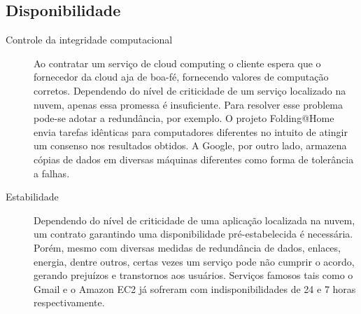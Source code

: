 \documentclass[brazil,12pt]{article}
\begin{document}
\subsection{Disponibilidade}
\begin{description}
  \item[Controle da integridade computacional] Ao contratar um serviço de cloud
  computing o cliente espera que o fornecedor da cloud aja de boa-fé, fornecendo
  valores de computação corretos. Dependendo do nível de criticidade de um
  serviço localizado na nuvem, apenas essa promessa é insuficiente. Para
  resolver esse problema pode-se adotar a redundância, por exemplo. O projeto
  Folding@Home envia tarefas idênticas para computadores diferentes no intuito
  de atingir um consenso nos resultados obtidos. A Google, por outro lado,
  armazena cópias de dados em diversas máquinas diferentes como forma de
  tolerância a falhas.
  \item[Estabilidade] Dependendo do nível de criticidade de uma aplicação
  localizada na nuvem, um contrato garantindo uma disponibilidade
  pré-estabelecida é necessária. Porém, mesmo com diversas medidas de
  redundância de dados, enlaces, energia, dentre outros, certas vezes um
  serviço pode não cumprir o acordo, gerando prejuízos e transtornos aos
  usuários. Serviços famosos tais como o Gmail e o Amazon EC2 já sofreram com
  indisponibilidades de 24 e 7 horas respectivamente. \cite{controlling-data-in-cloud}
\end{description}
\end{document}
